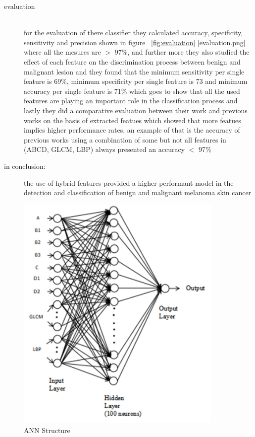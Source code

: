 \begin{description}
    \item [evaluation] \hfill \\
        for the evaluation of there classifier they calculated accuracy, specificity, sensitivity and precision shown in figure ~\ref{fig:evaluation} [evaluation.png] where all the mesures are $>$ 97\%, and further more they also studied the effect of each feature on the discrimination process between benign and malignant lesion and they found that the minimum sensitivity per single feature is 69\%, minimum specificity per single feature is 73 and minimum accuracy per single feature is 71\% which goes to show that all the used features are playing an important role in the classification process and lastly they did a comparative evaluation between their work and previous works on the basis of extracted featues which showed that more featues implies higher performance rates, an example of that is the accuracy of previous works using a combination of some but not all features in (ABCD, GLCM, LBP) always presented an accuracy $<$ 97\%

    \item [in conclusion: ] the use of hybrid features provided a higher performant model in the detection and classification of benign and malignant melanoma skin cancer 
    \end{description}


\begin{figure}[htbp]
\begin{center}
\includegraphics[width=10cm]{./chapter-03-state-of-the-art/ann.png}
\end{center}
\caption{ANN Structure}
\label{fig:ann}
\end{figure}

